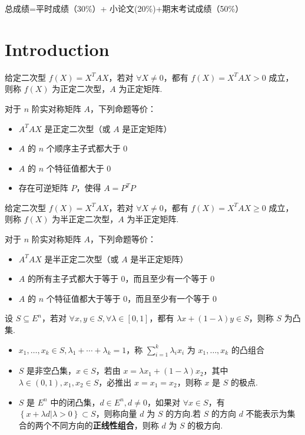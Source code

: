 

\newcommand\Title{最优化方法笔记}
\renewcommand\due{due: 16 weeks}
\newcommand\subject{\operatorname{subject\ to}}
\newcommand\st{\operatorname{s.t.}}



总成绩=平时成绩（30\%）+ 小论文(20\%)+期末考试成绩（50\%）
\section{Introduction}
\begin{remark}
    给定二次型 $f(X) = X^T AX$，若对 $\forall X \neq 0$，都有 $f(X) = X^T AX > 0$ 成立，则称 $f(X)$ 为正定二次型，$A$ 为正定矩阵.

    对于 $n$ 阶实对称矩阵 $A$，下列命题等价：
    \begin{itemize}
        \item $A^T AX$ 是正定二次型（或 $A$ 是正定矩阵）
        \item $A$ 的 $n$ 个顺序主子式都大于 0
        \item $A$ 的 $n$ 个特征值都大于 0
        \item 存在可逆矩阵 $P$，使得 $A = P^T P$
    \end{itemize}
\end{remark}

\begin{remark}
    给定二次型 $f(X) = X^T AX$，若对 $\forall X \neq 0$，都有 $f(X) = X^T AX \ge 0$ 成立，则称 $f(X)$ 为半正定二次型，$A$ 为半正定矩阵.

    对于 $n$ 阶实对称矩阵 $A$，下列命题等价：
    \begin{itemize}
        \item $A^T AX$ 是半正定二次型（或 $A$ 是半正定矩阵）
        \item $A$ 的所有主子式都大于等于 0，而且至少有一个等于 0
        \item $A$ 的 $n$ 个特征值都大于等于 0，而且至少有一个等于 0
    \end{itemize}
\end{remark}

\begin{remark}
    设 $S \subseteq E^n$，若对 $\forall x, y \in S, \forall \lambda \in [0, 1]$，都有 $\lambda x + (1 - \lambda)y \in S$，则称 $S$ 为凸集.
    \begin{itemize}
        \item $x_1, \dots, x_k \in S, \lambda_1 + \cdots + \lambda_k = 1$，称 $\sum_{i = 1}^k \lambda_ix_i$ 为 $x_1, \dots, x_k$ 的凸组合
        \item $S$ 是非空凸集，$x\in S$，若由 $x = \lambda x_1 + (1 - \lambda)x_2$，其中 $\lambda \in (0, 1), x_1, x_2 \in S$，必推出 $x = x_1 = x_2$，则称 $x$ 是 $S$ 的极点.
        \item $S$ 是 $E^n$ 中的闭凸集，$d \in E^n, d \neq 0$，如果对 $\forall x \in S$，有 $\left\{x + \lambda d | \lambda > 0\right\} \subset S$，则称向量 $d$ 为 $S$ 的方向.若 $S$ 的方向 $d$ 不能表示为集合的两个不同方向的\textbf{正线性组合}，则称 $d$ 为 $S$ 的极方向.
    \end{itemize}
\end{remark}

